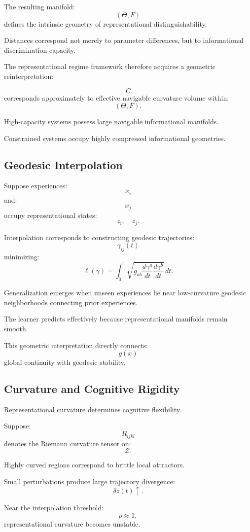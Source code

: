 \documentclass[12pt,a4paper]{article}
\begin{document}
The resulting manifold:
\[
(\Theta,F)
\]
defines the intrinsic geometry of representational distinguishability.

Distances correspond not merely to parameter differences, but to informational discrimination capacity.

The representational regime framework therefore acquires a geometric reinterpretation:

\[
C
\]
corresponds approximately to effective navigable curvature volume within:
\[
(\Theta,F).
\]

High-capacity systems possess large navigable informational manifolds.

Constrained systems occupy highly compressed informational geometries.

\subsection{Geodesic Interpolation}

Suppose experiences:
\[
x_i
\]
and:
\[
x_j
\]
occupy representational states:
\[
z_i,
\quad
z_j.
\]

Interpolation corresponds to constructing geodesic trajectories:
\[
\gamma_{ij}(t)
\]
minimizing:
\[
\ell(\gamma)
=
\int_0^1
\sqrt{
g_{ab}
\frac{d\gamma^a}{dt}
\frac{d\gamma^b}{dt}
}
\,dt.
\]

Generalization emerges when unseen experiences lie near low-curvature geodesic neighborhoods connecting prior experiences.

The learner predicts effectively because representational manifolds remain smooth.

This geometric interpretation directly connects:
\[
g(x)
\]
global continuity
with geodesic stability.

\subsection{Curvature and Cognitive Rigidity}

Representational curvature determines cognitive flexibility.

Suppose:
\[
R_{ijkl}
\]
denotes the Riemann curvature tensor on:
\[
\mathcal{Z}.
\]

Highly curved regions correspond to brittle local attractors.

Small perturbations produce large trajectory divergence:
\[
\delta z(t)
\uparrow.
\]

Near the interpolation threshold:
\[
\rho
\approx
1,
\]
representational curvature becomes unstable.
\end{document}
